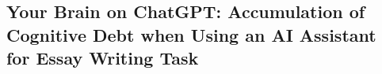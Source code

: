 \documentclass[../../main/main.tex]{subfiles}
\begin{document}
\subsection*{Your Brain on ChatGPT: Accumulation of Cognitive Debt when Using an AI Assistant for Essay Writing Task}

~\cite{kosmyna25-00}

\bibsub
\end{document}
